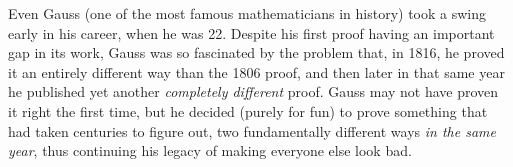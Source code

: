\documentclass{ximera}
\begin{document}
Even Gauss (one of the most famous mathematicians in history) took a swing early in his career, when he was 22. Despite his first proof having an important gap in its work, Gauss was so fascinated by the problem that, in 1816, he proved it an entirely different way than the 1806 proof, and then later in that same year he published yet another \textit{completely different} proof. Gauss may not have proven it right the first time, but he decided (purely for fun) to prove something that had taken centuries to figure out, two fundamentally different ways \textit{in the same year}, thus continuing his legacy of making everyone else look bad.

%
\end{document}
